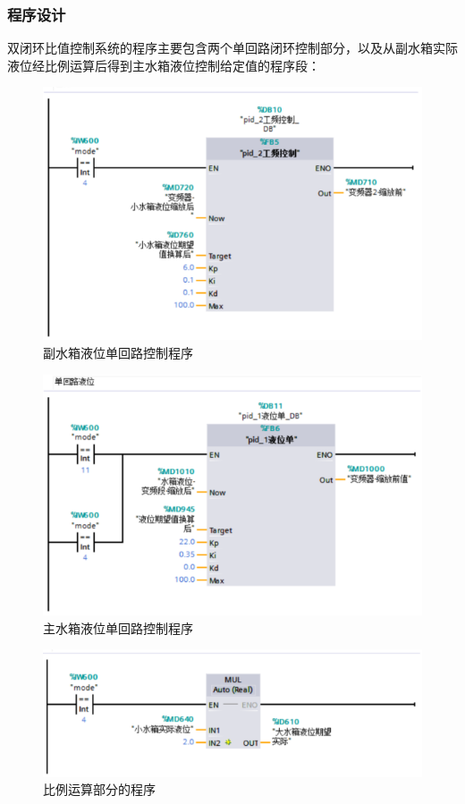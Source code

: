 \documentclass[UTF8]{article}
\begin{document}
\subsubsection{程序设计}
双闭环比值控制系统的程序主要包含两个单回路闭环控制部分，以及从副水箱实际液位经比例运算后得到主水箱液位控制给定值的程序段：
\begin{figure}[H]
    \centering %
    \includegraphics[width=.8\textwidth]{figure/比值控制-程序1.png} 
    \caption{副水箱液位单回路控制程序} %
\end{figure}
\begin{figure}[H]
    \centering %
    \includegraphics[width=.8\textwidth]{figure/比值控制-程序2.png} 
    \caption{主水箱液位单回路控制程序} %
\end{figure}
\begin{figure}[H]
    \centering %
    \includegraphics[width=.8\textwidth]{figure/比值控制-程序3.png} 
    \caption{比例运算部分的程序} %
\end{figure}
\end{document}
